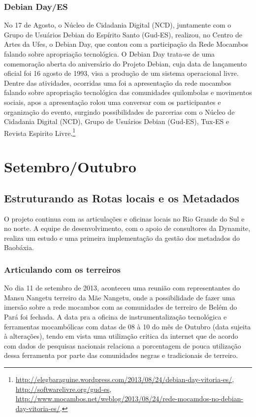 \documentclass[a4paper, 11pt, oneside]{Relatorio_sem}  %
\begin{document}
\section{Debian Day/ES}
No 17 de Agosto, o Núcleo de Cidadania Digital (NCD), juntamente com o
Grupo de Usuários Debian do Espírito Santo (Gud-ES), realizou, no
Centro de Artes da Ufes, o Debian Day, que contou com a participação
da Rede Mocambos falando sobre apropriação tecnológica.  O Debian Day
trata-se de uma comemoração aberta do aniversário do Projeto Debian,
cuja data de lançamento oficial foi 16 agosto de 1993, visa a produção
de um sistema operacional livre.  Dentre das atividades, ocorridas uma
foi a apresentação da rede mocambos falando sobre apropriação
tecnológica das comunidades quilombolas e movimentos sociais, apos a
apresentação rolou uma conversar com os participantes e organização do
evento, surgindo possibilidades de parcerias com o Núcleo de Cidadania
Digital (NCD), Grupo de Usuários Debian (Gud-ES), Tux-ES e Revista
Espirito
Livre.\footnote{\url{http://elegbaraguine.wordpress.com/2013/08/24/debian-day-vitoria-es/},
  \url{http://softwarelivre.org/gud-es},
  \url{http://www.mocambos.net/weblog/2013/08/24/rede-mocamdos-no-debian-day-vitoria-es/}.}



\part{Setembro/Outubro}
\chapter{Estruturando as Rotas locais e os Metadados}
O projeto continua com as articulações e oficinas locais no Rio Grande
do Sul e no norte. A equipe de desenvolvimento, com o apoio de
consultores da Dynamite, realiza um estudo e uma primeira
implementação da gestão dos metadados do Baobáxia.

\section{Articulando com os terreiros}
No dia 11 de setembro de 2013, aconteceu uma reunião com
representantes do Mansu Nangetu terreiro da Mãe Nangetu, onde a
possibilidade de fazer uma imersão sobre a rede mocambos com as
comunidades de terreiro de Belém do Pará foi fechada. A data pra a
oficina de instrumentalização tecnológica e ferramentas mocambólicas
com datas de 08 à 10 do mês de Outubro (data sujeita à alterações),
tendo em vista uma utilização critica da internet que de acordo com
dados de pesquisas nacionais relaciona a porcentagem de pouca
utilização dessa ferramenta por parte das comunidades negras e
tradicionais de terreiro.
\end{document}
